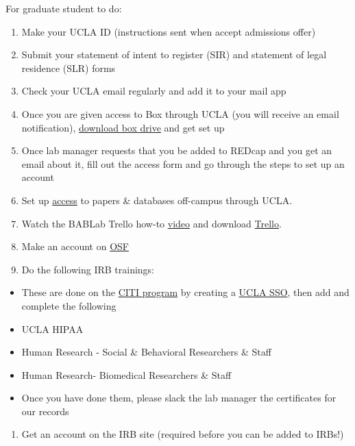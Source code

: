 \documentclass[
]{book}
\providecommand{\tightlist}{%
  \setlength{\itemsep}{0pt}\setlength{\parskip}{0pt}}
\begin{document}
For graduate student to do:

\begin{enumerate}
\def\labelenumi{\arabic{enumi}.}
\tightlist
\item
  Make your UCLA ID (instructions sent when accept admissions offer)
\item
  Submit your statement of intent to register (SIR) and statement of legal residence (SLR) forms
\item
  Check your UCLA email regularly and add it to your mail app
\item
  Once you are given access to Box through UCLA (you will receive an email notification), \href{https://www.box.com/resources/downloads}{download box drive} and get set up
\item
  Once lab manager requests that you be added to REDcap and you get an email about it, fill out the access form and go through the steps to set up an account
\item
  Set up \href{https://www.library.ucla.edu/use/computers-computing-services/connect-campus}{access} to papers \& databases off-campus through UCLA.
\item
  Watch the BABLab Trello how-to \href{https://www.youtube.com/watch?v=_Ry-SnJygy8\&feature=youtu.be\&ab_channel=BABLab}{video} and download \href{https://trello.com/en-US/platforms}{Trello}.
\item
  Make an account on \href{https://accounts.osf.io/login?service=https://osf.io/myprojects/}{OSF}
\item
  Do the following IRB trainings:
\end{enumerate}

\begin{itemize}
\tightlist
\item
  These are done on the \href{https://www.research.ucla.edu/CITIProgram/}{CITI program} by creating a \href{https://ora.research.ucla.edu/OHRPP/Documents/Education/SSO_CITI_New_Acct.pdf}{UCLA SSO}, then add and complete the following
\item
  UCLA HIPAA
\item
  Human Research - Social \& Behavioral Researchers \& Staff
\item
  Human Research- Biomedical Researchers \& Staff
\item
  Once you have done them, please slack the lab manager the certificates for our records
\end{itemize}

\begin{enumerate}
\def\labelenumi{\arabic{enumi}.}
\setcounter{enumi}{9}
\tightlist
\item
  Get an account on the IRB site (required before you can be added to IRBs!)
\end{enumerate}
\end{document}
